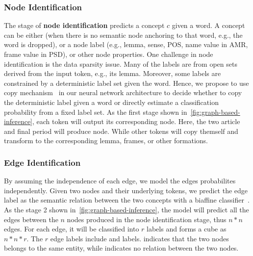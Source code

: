 \subsubsection{Node Identification}
\label{sssec:lex-phr:node-ident}
The stage of \textbf{node identification} predicts a concept $c$ given
a word. A concept can be either \tquoted{$\Phi$} (when there is no
semantic node anchoring to that word, e.g., the word is dropped), or a
node label (e.g., lemma, sense, POS, name value in AMR, frame value in
PSD), or other node properties. One challenge in node identification
is the data sparsity issue. Many of the labels are from open sets
derived from the input token, e.g., its lemma.  Moreover, some labels
are constrained by a deterministic label set given the word. Hence, we
propose to use copy mechanism~\citep{luong2014addressing} in our
neural network architecture to decide whether to copy the
deterministic label given a word or directly estimate a classification
probability from a fixed label set. As the first stage shown
in~\autoref{fig:graph-based-inference}, each token will output its
corresponding node. Here, the two article  
and final period will produce \tquoted{$\Phi$} node. While other tokens
will copy themself and transform to the corresponding lemma, frames,
or other formations.

\subsubsection{Edge Identification}
\label{sssec:lex-phr:edge-ident}
By assuming the independence of each edge, we model the edges
probabilites independently.  Given two nodes and their underlying
tokens, we predict the edge label as the semantic relation between the
two concepts with a biaffine classifier~\cite{dozat2016deep}. As the
stage 2 shown in~\autoref{fig:graph-based-inference}, the model will
predict all the edges between the $n$ nodes produced in the node
identification stage, thus $n*n$ edges. For each edge, it will be
classified into $r$ labels and forms a cube as $n*n*r$. The $r$ edge
labels include  and 
labels.  indicates that the two nodes belongs to the
same entity, while  indicates no relation between the
two nodes.

